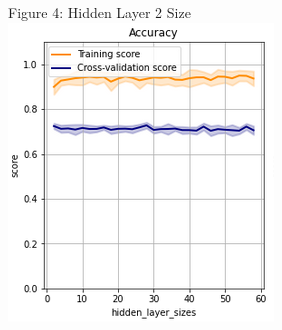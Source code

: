 \documentclass{article}
\begin{document}
\begin{figure}
\begin{subfigure}{.3\textwidth}
	\end{subfigure}
	\begin{subfigure}{.3\textwidth}
		\centering
		Figure 4: Hidden Layer 2 Size\\
		\includegraphics[width=\linewidth]{poland_nn_hidden_layer_2_size_2_60_accuracy.png}
		

\end{subfigure}
\end{figure}
\end{document}
